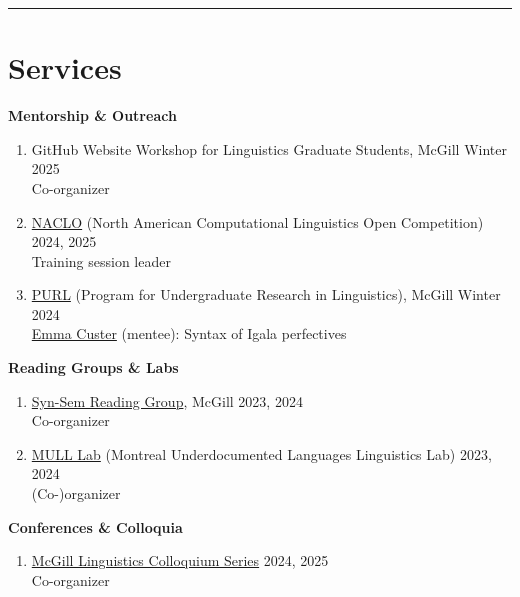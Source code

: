 \documentclass[margin,line]{resume}
\begin{document}
\begin{resume}
		\vspace{-0.9em}\rule{\textwidth}{0.4pt}


	\vspace{-0.5em}

	\section{\mysidestyle Services}


	\textbf{Mentorship \& Outreach}
	\begin{enumerate}[-, leftmargin=1em, topsep=2pt]
		\item[] GitHub Website Workshop for Linguistics Graduate Students, McGill \hfill Winter 2025\\
		\hphantom{...}Co-organizer

		\item[] \href{https://naclo.org/}{NACLO} (North American Computational Linguistics Open Competition) \hfill 2024, 2025\\
		      \hphantom{...}Training session leader

		\item[] \href{https://www.mcgill.ca/cogsci/research/cogs396}{PURL} (Program for Undergraduate Research in Linguistics), McGill \hfill Winter 2024\\
		      \hphantom{...}\href{https://www.linkedin.com/in/emma-custer-648345252}{Emma Custer} (mentee): Syntax of Igala perfectives
	\end{enumerate}

	\textbf{Reading Groups \& Labs}
	\begin{enumerate}[-, leftmargin=1em, topsep=2pt]
		\item[] \href{https://mcling.blogs.mcgill.ca/category/syntax-semantics-group/}{Syn-Sem Reading Group}, McGill \hfill 2023, 2024\\
		\hphantom{...}Co-organizer

		\item[] \href{https://mcling.blogs.mcgill.ca/category/mull-lab/}{MULL Lab} (Montreal Underdocumented Languages Linguistics Lab) \hfill 2023, 2024\\
		      \hphantom{...}(Co-)organizer
	\end{enumerate}

	\textbf{Conferences \& Colloquia}
	\begin{enumerate}[-, leftmargin=1em, topsep=2pt]
		\item[] \href{https://www.mcgill.ca/linguistics/events/colloquium-series}{McGill Linguistics Colloquium Series} \hfill 2024, 2025\\
		      \hphantom{...}Co-organizer


\end{enumerate}
\end{resume}
\end{document}
